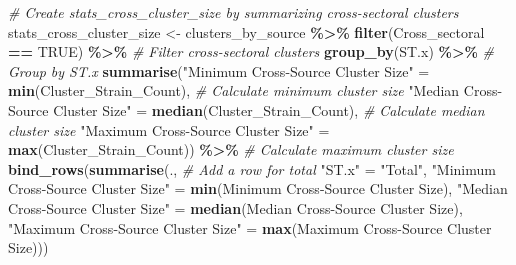 \documentclass[
]{article}
\newenvironment{Shaded}{\begin{snugshade}}{\end{snugshade}}
\newcommand{\AttributeTok}[1]{\textcolor[rgb]{0.13,0.29,0.53}{#1}}
\newcommand{\CommentTok}[1]{\textcolor[rgb]{0.56,0.35,0.01}{\textit{#1}}}
\newcommand{\ConstantTok}[1]{\textcolor[rgb]{0.56,0.35,0.01}{#1}}
\newcommand{\FunctionTok}[1]{\textcolor[rgb]{0.13,0.29,0.53}{\textbf{#1}}}
\newcommand{\NormalTok}[1]{#1}
\newcommand{\OtherTok}[1]{\textcolor[rgb]{0.56,0.35,0.01}{#1}}
\newcommand{\SpecialCharTok}[1]{\textcolor[rgb]{0.81,0.36,0.00}{\textbf{#1}}}
\newcommand{\StringTok}[1]{\textcolor[rgb]{0.31,0.60,0.02}{#1}}
\begin{document}
\begin{Shaded}
\begin{Highlighting}[]
\CommentTok{\# Create stats\_cross\_cluster\_size by summarizing cross{-}sectoral clusters}
\NormalTok{stats\_cross\_cluster\_size }\OtherTok{\textless{}{-}}\NormalTok{ clusters\_by\_source }\SpecialCharTok{\%\textgreater{}\%}
  \FunctionTok{filter}\NormalTok{(Cross\_sectoral }\SpecialCharTok{==} \ConstantTok{TRUE}\NormalTok{) }\SpecialCharTok{\%\textgreater{}\%}                                              \CommentTok{\# Filter cross{-}sectoral clusters}
  \FunctionTok{group\_by}\NormalTok{(ST.x) }\SpecialCharTok{\%\textgreater{}\%}                                                              \CommentTok{\# Group by ST.x}
  \FunctionTok{summarise}\NormalTok{(}\StringTok{"Minimum Cross{-}Source Cluster Size"} \OtherTok{=} \FunctionTok{min}\NormalTok{(Cluster\_Strain\_Count),      }\CommentTok{\# Calculate minimum cluster size}
            \StringTok{"Median Cross{-}Source Cluster Size"} \OtherTok{=} \FunctionTok{median}\NormalTok{(Cluster\_Strain\_Count),    }\CommentTok{\# Calculate median cluster size}
            \StringTok{"Maximum Cross{-}Source Cluster Size"} \OtherTok{=} \FunctionTok{max}\NormalTok{(Cluster\_Strain\_Count)) }\SpecialCharTok{\%\textgreater{}\%}  \CommentTok{\# Calculate maximum cluster size}
  \FunctionTok{bind\_rows}\NormalTok{(}\FunctionTok{summarise}\NormalTok{(.,                                                          }\CommentTok{\# Add a row for total}
                      \StringTok{"ST.x"} \OtherTok{=} \StringTok{"Total"}\NormalTok{,}
                      \StringTok{"Minimum Cross{-}Source Cluster Size"} \OtherTok{=} \FunctionTok{min}\NormalTok{(}\StringTok{\textasciigrave{}}\AttributeTok{Minimum Cross{-}Source Cluster Size}\StringTok{\textasciigrave{}}\NormalTok{),}
                      \StringTok{"Median Cross{-}Source Cluster Size"} \OtherTok{=} \FunctionTok{median}\NormalTok{(}\StringTok{\textasciigrave{}}\AttributeTok{Median Cross{-}Source Cluster Size}\StringTok{\textasciigrave{}}\NormalTok{),}
                      \StringTok{"Maximum Cross{-}Source Cluster Size"} \OtherTok{=} \FunctionTok{max}\NormalTok{(}\StringTok{\textasciigrave{}}\AttributeTok{Maximum Cross{-}Source Cluster Size}\StringTok{\textasciigrave{}}\NormalTok{)))}


\end{Highlighting}
\end{Shaded}
\end{document}

